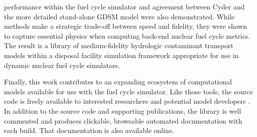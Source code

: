 \Cyder performance within the \Cyclus fuel cycle simulator and agreement
between Cyder and the more detailed stand-alone \gls{GDSM} model were also demonstrated.
While \Cyder methods make a strategic trade-off between speed and fidelity, they were shown to capture
essential physics when computing back-end nuclear fuel cycle metrics. The
result is a library of medium-fidelity hydrologic contaminant transport models
within a disposal facility simulation framework appropriate for use in dynamic
nuclear fuel cycle simulators.

Finally, this work contributes to an expanding ecosystem of computational
models available for use with the \Cyclus fuel cycle simulator. 
Like those tools, the \Cyder source code is freely available to interested researchers and
potential model developers \cite{huff_cyder_2013}.  In addition to the source
code and supporting publications, the \Cyder library is well commented and
produces clickable, browsable automated documentation with each build. That
documentation is also available online. 


